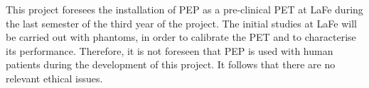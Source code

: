 This project foresees the installation of PEP as a pre-clinical PET at LaFe during the last semester of the third year of the project. The initial studies at LaFe will be carried out with phantoms, in order to calibrate the PET and to characterise its performance. Therefore, it is not foreseen that PEP is used with human patients during the development of this project. It follows that there are no relevant ethical issues. 

